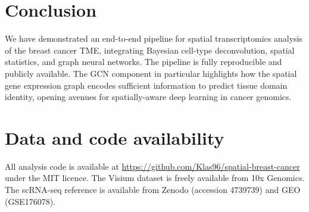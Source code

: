 \documentclass[12pt, a4paper]{article}
\begin{document}
\section{Conclusion}

We have demonstrated an end-to-end pipeline for spatial transcriptomics analysis of the breast cancer TME, integrating Bayesian cell-type deconvolution, spatial statistics, and graph neural networks. The pipeline is fully reproducible and publicly available. The GCN component in particular highlights how the spatial gene expression graph encodes sufficient information to predict tissue domain identity, opening avenues for spatially-aware deep learning in cancer genomics.

\section*{Data and code availability}

All analysis code is available at \url{https://github.com/Klas96/spatial-breast-cancer} under the MIT licence. The Visium dataset is freely available from 10x Genomics. The scRNA-seq reference is available from Zenodo (accession 4739739) and GEO (GSE176078).



\end{document}
